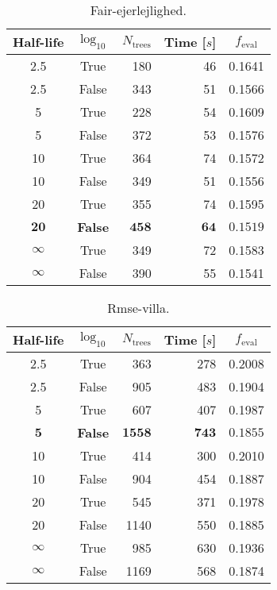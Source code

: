 
\begin{table}[h!]
  \begin{tabular}{@{}ccrrc@{}}
    Half-life & $\log_{10}$ & $N_\mathrm{trees}$ & Time [$s$] & $f_\mathrm{eval}$ \\
    \midrule
    \num{2.5} & True & \num{180} & \num{46} & \num{0.1641} \\
    \num{2.5} & False & \num{343} & \num{51} & \num{0.1566} \\
    \num{5} & True & \num{228} & \num{54} & \num{0.1609} \\
    \num{5} & False & \num{372} & \num{53} & \num{0.1576} \\
    \num{10} & True & \num{364} & \num{74} & \num{0.1572} \\
    \num{10} & False & \num{349} & \num{51} & \num{0.1556} \\
    \num{20} & True & \num{355} & \num{74} & \num{0.1595} \\
    $\mathbf{20}$ & \textbf{False} & $\mathbf{458}$ & $\mathbf{64}$ & $\mathbf{0.1519}$ \\
    $\infty$ & True & \num{349} & \num{72} & \num{0.1583} \\
    $\infty$ & False & \num{390} & \num{55} & \num{0.1541} \\
  \end{tabular}
  \caption{\label{tab:h:HPO_initial_Fair-ejerlejlighed}Fair-ejerlejlighed.}
\end{table}






 \begin{table}[h!]
  \begin{tabular}{@{}ccrrc@{}}
    Half-life & $\log_{10}$ & $N_\mathrm{trees}$ & Time [$s$] & $f_\mathrm{eval}$ \\
    \midrule
    \num{2.5} & True & \num{363} & \num{278} & \num{0.2008} \\
    \num{2.5} & False & \num{905} & \num{483} & \num{0.1904} \\
    \num{5} & True & \num{607} & \num{407} & \num{0.1987} \\
    $\mathbf{5}$ & \textbf{False} & $\mathbf{1558}$ & $\mathbf{743}$ & $\mathbf{0.1855}$ \\
    \num{10} & True & \num{414} & \num{300} & \num{0.2010} \\
    \num{10} & False & \num{904} & \num{454} & \num{0.1887} \\
    \num{20} & True & \num{545} & \num{371} & \num{0.1978} \\
    \num{20} & False & \num{1140} & \num{550} & \num{0.1885} \\
    $\infty$ & True & \num{985} & \num{630} & \num{0.1936} \\
    $\infty$ & False & \num{1169} & \num{568} & \num{0.1874} \\
  \end{tabular}
  \caption{\label{tab:h:HPO_initial_Rmse-villa}Rmse-villa.}
\end{table}

